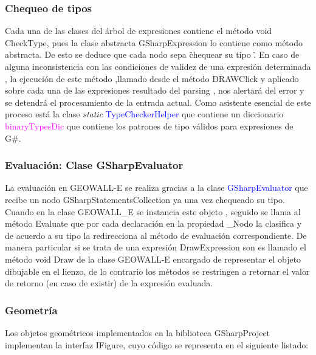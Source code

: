 \documentclass[a4paper, 12pt]{article}
\begin{document}
\subsubsection{Chequeo de tipos}\label{}
Cada una de las clases del árbol de expresiones contiene el método void CheckType, pues la clase abstracta GSharpExpression lo contiene como método abstracta. De esto se deduce que cada nodo sepa \" chequear su tipo \" . En caso de alguna inconsistencia con las condiciones de validez de una expresión determinada , la ejecución de este método ,llamado desde el método DRAWClick y aplicado sobre cada una de las expresiones resultado del parsing , nos alertará del error y se detendrá el procesamiento de la entrada actual. Como asistente esencial de este proceso está la clase \textit{static} \textcolor{blue}{ TypeCheckerHelper} que contiene un diccionario
\textcolor{magenta}{binaryTypesDic} que contiene los patrones de tipo válidos para expresiones de G\#.
 
\subsubsection{Evaluación: Clase GSharpEvaluator}\label{}
La evaluación en GEOWALL-E se realiza gracias a la clase \textcolor{blue}{ GSharpEvaluator} que recibe un nodo GSharpStatementsCollection ya una vez chequeado su tipo. Cuando en la clase GEOWALL\_E se instancia este objeto , seguido se llama al método Evaluate que por cada declaración en la propiedad \_Nodo la clasifica y de acuerdo a su tipo la redirecciona al método de evaluación correspondiente. De manera particular si se trata de una expresión DrawExpression son es llamado el método void Draw de la clase GEOWALL-E encargado de representar el objeto dibujable en el lienzo, de lo contrario los métodos se restringen a retornar el valor de retorno (en caso de existir) de la expresión evaluada.

\subsubsection{Geometría}\label{}
Los objetos geométricos implementados en la biblioteca GSharpProject implementan la interfaz IFigure, cuyo código se representa en el siguiente listado:
\end{document}
